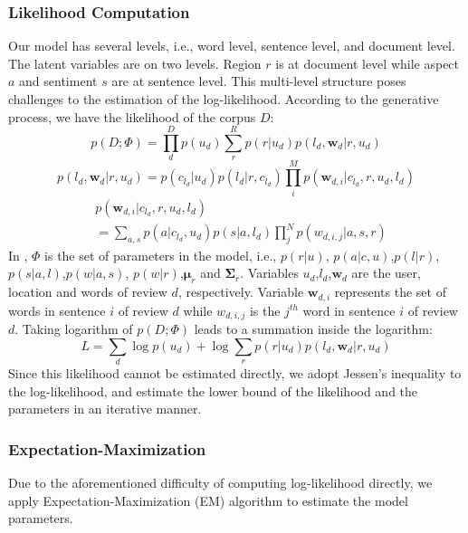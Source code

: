\subsubsection{Likelihood Computation}
Our model has several levels, i.e., word level,
sentence level, and document level. The latent variables
are on two levels. Region $r$ is at document level while
aspect $a$ and sentiment $s$ are at sentence level.
This multi-level structure poses challenges to the estimation of
the log-likelihood. According to the generative
process, we have the likelihood of the corpus $D$:
\begin{equation}
p(D;\Phi)=\prod_{d}^{D}{p(u_d)\sum_{r}^{R}{p(r|u_d)}p(l_d,\mathbf{w}_d|r,u_d)}
\label{eq:likeli1}
\end{equation}
\begin{equation}
p(l_d,\mathbf{w}_d|r,u_d)=p(c_{l_d}|u_d)p(l_d|r,c_{l_d})\prod_{i}^{M}{p(\mathbf{w}_{d,i}|c_{l_d},r,u_d,l_d)}
\label{eq:likeli2}
\end{equation}
\begin{equation}
\begin{split}
&p(\mathbf{w}_{d,i}|c_{l_d},r,u_d,l_d) \\
&=\sum_{a,s}{p(a|c_{l_d},u_d)p(s|a,l_d)\prod_{j}^{N}{p(w_{d,i,j}|a,s,r)}}
\end{split}
\label{eq:likeli3}
\end{equation}
In , $\Phi$ is the set of parameters in the model,
i.e., $p(r|u)$, $p(a|c,u)$,$p(l|r)$,$p(s|a,l)$,$p(w|a,s)$,
$p(w|r)$,$\boldsymbol{\mu}_r$ and $\boldsymbol{\Sigma}_r$.
Variables $u_d$,$l_d$,$\mathbf{w}_d$ are the user, location and
words of review $d$, respectively. Variable $\mathbf{w}_{d,i}$
represents the set of words in sentence $i$ of review $d$
while $w_{d,i,j}$ is the $j^{th}$ word in sentence
$i$ of review $d$. Taking logarithm of
$p(D;\Phi)$ leads to a summation inside the logarithm:
\begin{equation}
L=\sum_{d}{\log{p(u_d)}+\log{\sum_{r}{p(r|u_d)p(l_d,\mathbf{w}_d|r,u_d)}}}
\label{eq:loglikeli}
\end{equation}
Since this likelihood cannot be estimated directly,
we adopt Jessen's
inequality to the log-likelihood, and estimate the
lower bound of the likelihood and the parameters
in an iterative manner.

\subsubsection{Expectation-Maximization}
Due to the aforementioned difficulty of computing
log-likelihood directly,
we apply Expectation-Maximization (EM)
algorithm to estimate the model parameters.

